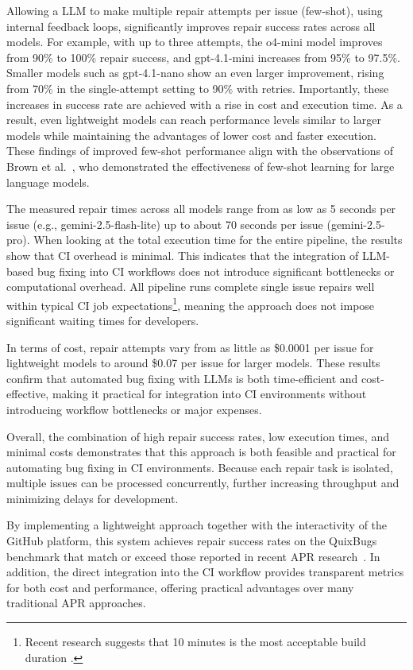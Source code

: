 Allowing a \ac{LLM} to make multiple repair attempts per issue (few-shot), using internal feedback loops, significantly improves repair success rates across all models. For example, with up to three attempts, the o4-mini model improves from 90\% to 100\% repair success, and gpt-4.1-mini increases from 95\% to 97.5\%. Smaller models such as gpt-4.1-nano show an even larger improvement, rising from 70\% in the single-attempt setting to 90\% with retries. Importantly, these increases in success rate are achieved with a rise in cost and execution time. As a result, even lightweight models can reach performance levels similar to larger models while maintaining the advantages of lower cost and faster execution. These findings of improved few-shot performance align with the observations of Brown et al.~\cite{brownLanguageModelsAre2020}, who demonstrated the effectiveness of few-shot learning for large language models.

The measured repair times across all models range from as low as 5 seconds per issue (e.g., gemini-2.5-flash-lite) up to about 70 seconds per issue (gemini-2.5-pro). When looking at the total execution time for the entire pipeline, the results show that \ac{CI} overhead is minimal. This indicates that the integration of LLM-based bug fixing into CI workflows does not introduce significant bottlenecks or computational overhead. All pipeline runs complete single issue repairs well within typical CI job expectations\footnote{Recent research suggests that 10 minutes is the most acceptable build duration \cite{hiltonTradeoffsContinuousIntegration2017}.}, meaning the approach does not impose significant waiting times for developers.

In terms of cost, repair attempts vary from as little as \$0.0001 per issue for lightweight models to around \$0.07 per issue for larger models. These results confirm that automated bug fixing with \acp{LLM} is both time-efficient and cost-effective, making it practical for integration into \ac{CI} environments without introducing workflow bottlenecks or major expenses.

Overall, the combination of high repair success rates, low execution times, and minimal costs demonstrates that this approach is both feasible and practical for automating bug fixing in CI environments. Because each repair task is isolated, multiple issues can be processed concurrently, further increasing throughput and minimizing delays for development.

By implementing a lightweight approach together with the interactivity of the GitHub platform, this system achieves repair success rates on the QuixBugs benchmark that match or exceed those reported in recent APR research~\cite{huCanGPTO1Kill2024,yinThinkRepairSelfDirectedAutomated2024, zhangSTEAMSimulatingInTeractive2025, xiaLessTrainingMore2022 }. In addition, the direct integration into the CI workflow provides transparent metrics for both cost and performance, offering practical advantages over many traditional APR approaches.

